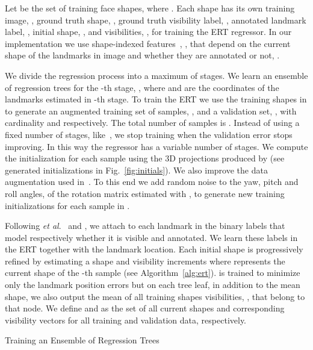 \documentclass[11pt,twocolumn]{article}
\newcommand{\etal}{\textit{et al}.}
\begin{document}
Let  be the set of training face shapes, where . Each shape  has its own training image, , ground truth shape, , ground truth visibility label, , annotated landmark label, , initial shape, , and visibilities, , for training the ERT regressor. 
In our implementation we use shape-indexed features~\citep{Lee15b}, , that depend on the current shape  of the landmarks in image  and whether they are annotated or not, .

We divide the regression process into a maximum of  stages. We learn an ensemble of  regression trees for the -th stage, , where  and  are the coordinates of the landmarks estimated in -th stage. To train the ERT we use the  training shapes in  to generate an augmented training set of samples, , and a validation set, , with cardinality  and  respectively. The total number of samples is . Instead of using a fixed number of stages, like~\cite{Valle18}, we stop training when the validation error stops improving. In this way the regressor has a variable number of stages. We compute the initialization for each sample using the 3D projections produced by  (see generated initializations in Fig.~\ref{fig:initials}). We also improve the data augmentation used in~\cite{Valle18}. 
To this end we add random noise to the yaw, pitch and roll angles, of
the rotation matrix  estimated with , to generate new training initializations for each sample in .

Following \etal~\cite{Burgos13} and \cite{Kazemi14}, we attach to each landmark in  the binary labels  that model respectively whether it is visible and annotated. We learn these labels in the ERT together with the landmark location. Each initial shape is progressively refined by estimating a shape and visibility increments  where  represents the current shape of the -th sample (see Algorithm~\ref{alg:ert}).  is trained to minimize only the landmark position errors but on each tree leaf, in addition to the mean shape, we also output the mean of all training shapes visibilities, , that belong to that node. We define  and  as the set of all current shapes and corresponding visibility vectors for all training and validation data, respectively. 

\begin{algorithm}
\footnotesize
\caption{Training an Ensemble of Regression Trees}
\label{alg:ert}
\end{algorithm}
\end{document}

